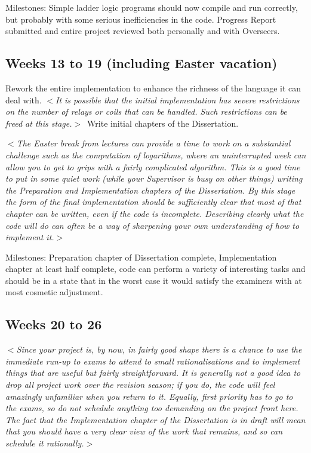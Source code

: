 \documentclass[12pt]{article}
\newcommand{\al}{$<$}
\newcommand{\ar}{$>$}
\begin{document}
Milestones: Simple ladder logic programs should now compile and run
correctly, but probably with some serious inefficiencies in the code.
Progress Report submitted and entire project reviewed both personally
and with Overseers.


\subsection*{Weeks 13 to 19 (including Easter vacation)}

Rework the entire implementation to enhance the
richness of the language it can deal with. \al\emph{It is possible that
the initial implementation has severe restrictions on the number of
relays or coils that can be handled. Such restrictions can be freed at
this stage.}\ar\  Write initial chapters of the Dissertation.

\al\emph{The Easter break from lectures can provide a time to work on a
substantial challenge such as the computation of logarithms, where an
uninterrupted week can allow you to get to grips with a fairly
complicated algorithm.  This is a good time to put in some quiet work
(while your Supervisor is busy on other things) writing the
Preparation and Implementation chapters of the Dissertation.  By this
stage the form of the final implementation should be sufficiently
clear that most of that chapter can be written, even if the code is
incomplete.  Describing clearly what the code will do can often be a
way of sharpening your own understanding of how to implement it.}\ar

Milestones: Preparation chapter of Dissertation complete,
Implementation chapter at least half complete, code can perform a
variety of interesting tasks and should be in a state that in the
worst case it would satisfy the examiners with at most cosmetic
adjustment.


\subsection*{Weeks 20 to 26}

\al\emph{Since your project is, by now, in fairly good shape there is
a chance to use the immediate run-up to exams to attend to small
rationalisations and to implement things that are useful but fairly
straightforward.  It is generally not a good idea to drop all project
work over the revision season; if you do, the code will feel amazingly
unfamiliar when you return to it.  Equally, first priority has to go
to the exams, so do not schedule anything too demanding on the project
front here.  The fact that the Implementation chapter of the
Dissertation is in draft will mean that you should have a very clear
view of the work that remains, and so can schedule it rationally.}\ar
\end{document}
